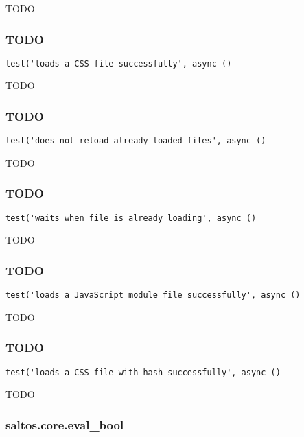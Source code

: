 \documentclass[a4paper]{article}
\begin{document}
TODO

\hypertarget{toc526}{}
\subsubsection{TODO}

\begin{lstlisting}
test('loads a CSS file successfully', async ()
\end{lstlisting}

TODO

\hypertarget{toc527}{}
\subsubsection{TODO}

\begin{lstlisting}
test('does not reload already loaded files', async ()
\end{lstlisting}

TODO

\hypertarget{toc528}{}
\subsubsection{TODO}

\begin{lstlisting}
test('waits when file is already loading', async ()
\end{lstlisting}

TODO

\hypertarget{toc529}{}
\subsubsection{TODO}

\begin{lstlisting}
test('loads a JavaScript module file successfully', async ()
\end{lstlisting}

TODO

\hypertarget{toc530}{}
\subsubsection{TODO}

\begin{lstlisting}
test('loads a CSS file with hash successfully', async ()
\end{lstlisting}

TODO

\hypertarget{toc531}{}
\subsubsection{saltos.core.eval\_bool}
\end{document}
